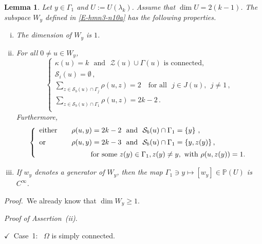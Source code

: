 \documentclass[12pt,a4paper]{amsart}
\theoremstyle{plain} %
\newtheorem{lemma}[theorem]{Lemma}
\theoremstyle{definition}
\numberwithin{equation}{section}
\numberwithin{figure}{section}
\numberwithin{table}{section}
\newcommand{\bP}{\mathbb{P}}
\newcommand{\cS}{\mathcal{S}}
\newcommand{\cZ}{\mathcal{Z}}
\newcommand{\pf}{\emph{Proof.~}}
\newcommand{\set}[1]{\left\lbrace #1 \right\rbrace}
\newcommand{\noi}{\noindent}
\newcommand{\noih}{\noindent $\checkmark$~}
\begin{document}
\begin{lemma}\label{L-L32}
Let $y \in \Gamma_1$ and $U:= U(\lambda_k)$.  Assume that $\dim U = 2(k-1)$.
 The subspace $W_y$ defined in \eqref{E-hmn3-n10a} has the following properties.
\begin{enumerate}[(i)]
  \item  The dimension of $W_y$ is $1$.
  \item For all $0 \neq u \in W_y$,
%
  \begin{equation}\label{E-hmn3-n10b}
  \left\{
\begin{array}{l}
\kappa(u) = k \text{~~and~~} \cZ(u) \cup \Gamma(u) \text{~is connected,}\\[5pt]
\cS_i(u) = \emptyset\,,\\[5pt]
\sum_{z \in \cS_b(u)\cap \Gamma_j} \rho(u,z) = 2 \quad \text{for all~~} j \in J(u), ~~ j \neq 1\,,\\[5pt]
 \sum_{z \in \cS_b(u)\cap \Gamma_1} \rho(u,z) = 2k - 2\,.\\[5pt]
\end{array}
\right.
  \end{equation}
%
Furthermore,
%
  \begin{equation}\label{E-hmn3-n10d}
\left\{
\begin{array}{ll}
\text{either\quad} & \rho(u,y) = 2k -2 \text{~~and~~} \cS_b(u)\cap \Gamma_1 = \set{y}\,,\\[5pt]
\text{or\quad} & \rho(u,y) = 2k -3 \text{~~and~~} \cS_b(u)\cap \Gamma_1 = \set{y,z(y)},\\[5pt]
&\qquad \text{~~for some~} z(y) \in \Gamma_1, z(y) \neq y, \text{~with~} \rho(u,z(y)) = 1.
\end{array}
\right.
\end{equation}
  \item If $w_y$ denotes a generator of $W_y$, then the map $\Gamma_1 \ni y \mapsto [w_y] \in \bP(U)$ is $C^{\infty}$.
\end{enumerate}
\end{lemma}


\pf We already know that $\dim W_y \ge 1$. \smallskip

\noi \emph{Proof of Assertion~(ii)}.\smallskip

\noih Case~1:~ $\Omega$ is simply connected.\smallskip
\end{document}
